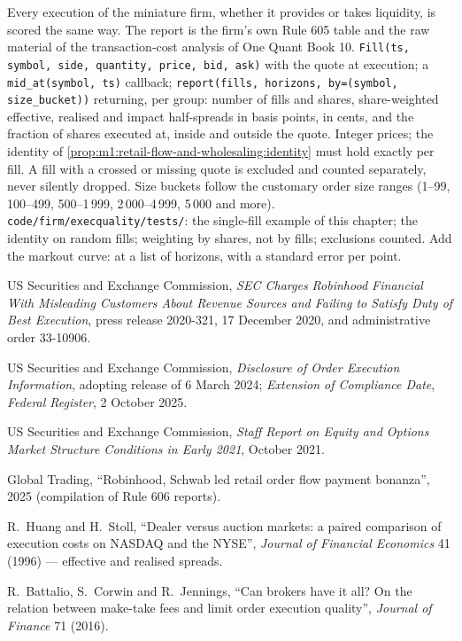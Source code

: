 \begin{build}
 Every execution of the miniature firm, whether it provides
or takes liquidity, is scored the same way. The report is the firm's own
Rule 605 table and the raw material of the transaction-cost analysis of One
Quant Book 10.
 \texttt{Fill(ts, symbol, side, quantity, price, bid, ask)}
with the quote at execution; a \texttt{mid\_at(symbol, ts)} callback;
\texttt{report(fills, horizons, by=(symbol, size\_bucket))} returning,
per group: number of fills and shares, share-weighted effective, realised and
impact half-spreads in basis points,  in cents, and the
fraction of shares executed at, inside and outside the quote.
 Integer prices; the identity of
\cref{prop:m1:retail-flow-and-wholesaling:identity} must hold exactly per
fill. A fill with a crossed or missing quote is excluded and counted
separately, never silently dropped. Size buckets follow the customary order
size ranges (1--99, 100--499, 500--1\,999, 2\,000--4\,999, 5\,000 and more).
 \texttt{code/firm/execquality/tests/}: the
single-fill example of this chapter; the identity on random fills; weighting
by shares, not by fills; exclusions counted.
 Add the markout curve:  at a list of
horizons, with a standard error per point.
\end{build}

\begin{omsources}
\item US Securities and Exchange Commission, \emph{SEC Charges Robinhood
Financial With Misleading Customers About Revenue Sources and Failing to
Satisfy Duty of Best Execution}, press release 2020-321, 17 December 2020,
and administrative order 33-10906.
\item US Securities and Exchange Commission, \emph{Disclosure of Order
Execution Information}, adopting release of 6 March 2024; \emph{Extension of
Compliance Date}, \emph{Federal Register}, 2 October 2025.
\item US Securities and Exchange Commission, \emph{Staff Report on Equity and
Options Market Structure Conditions in Early 2021}, October 2021.
\item Global Trading, ``Robinhood, Schwab led retail order flow payment
bonanza'', 2025 (compilation of Rule 606 reports).
\item R.~Huang and H.~Stoll, ``Dealer versus auction markets: a paired
comparison of execution costs on NASDAQ and the NYSE'', \emph{Journal of
Financial Economics} 41 (1996) --- effective and realised spreads.
\item R.~Battalio, S.~Corwin and R.~Jennings, ``Can brokers have it all? On
the relation between make-take fees and limit order execution quality'',
\emph{Journal of Finance} 71 (2016).
\end{omsources}

